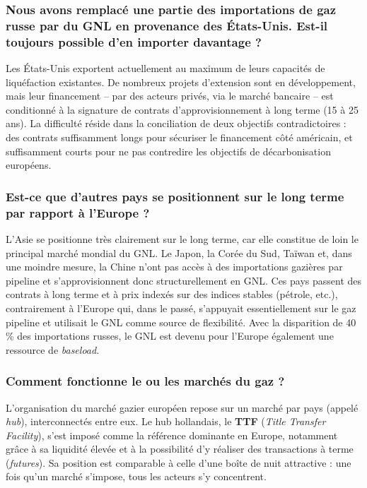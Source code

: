 \subsubsection{Nous avons remplacé une partie des importations de gaz russe par du GNL en provenance des États-Unis. Est-il toujours possible d'en importer davantage ?}

Les États-Unis exportent actuellement au maximum de leurs capacités de liquéfaction existantes. De nombreux projets d'extension sont en développement, mais leur financement -- par des acteurs privés, via le marché bancaire -- est conditionné à la signature de contrats d'approvisionnement à long terme (15 à 25 ans). La difficulté réside dans la conciliation de deux objectifs contradictoires : des contrats suffisamment longs pour sécuriser le financement côté américain, et suffisamment courts pour ne pas contredire les objectifs de décarbonisation européens.

\subsubsection{Est-ce que d'autres pays se positionnent sur le long terme par rapport à l'Europe ?}

L'Asie se positionne très clairement sur le long terme, car elle constitue de loin le principal marché mondial du GNL. Le Japon, la Corée du Sud, Taïwan et, dans une moindre mesure, la Chine n'ont pas accès à des importations gazières par pipeline et s'approvisionnent donc structurellement en GNL. Ces pays passent des contrats à long terme et à prix indexés sur des indices stables (pétrole, etc.), contrairement à l'Europe qui, dans le passé, s'appuyait essentiellement sur le gaz pipeline et utilisait le GNL comme source de flexibilité. Avec la disparition de 40\,\% des importations russes, le GNL est devenu pour l'Europe également une ressource de \textit{baseload}.

\subsubsection{Comment fonctionne le ou les marchés du gaz ?}

L'organisation du marché gazier européen repose sur un marché par pays (appelé \textit{hub}), interconnectés entre eux. Le hub hollandais, le \textbf{TTF} (\textit{Title Transfer Facility}), s'est imposé comme la référence dominante en Europe, notamment grâce à sa liquidité élevée et à la possibilité d'y réaliser des transactions à terme (\textit{futures}). Sa position est comparable à celle d'une boîte de nuit attractive : une fois qu'un marché s'impose, tous les acteurs s'y concentrent.

